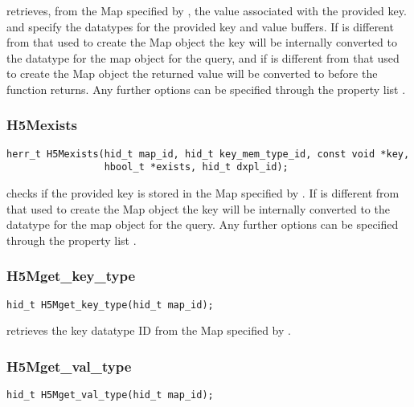 \documentclass[../design_doc.tex]{subfiles}
\begin{document}
 retrieves, from the Map specified by , the value associated with the provided key.  and  specify the datatypes for the provided key and value buffers. If  is different from that used to create the Map object the key will be internally converted to the datatype for the map object for the query, and if  is different from that used to create the Map object the returned value will be converted to  before the function returns. Any further options can be specified through the property list .

\subsubsection{H5Mexists}

\begin{verbatim}
herr_t H5Mexists(hid_t map_id, hid_t key_mem_type_id, const void *key,
                 hbool_t *exists, hid_t dxpl_id);
\end{verbatim}

 checks if the provided key is stored in the Map specified by . If  is different from that used to create the Map object the key will be internally converted to the datatype for the map object for the query. Any further options can be specified through the property list .

\subsubsection{H5Mget\_key\_type}

\begin{verbatim}
hid_t H5Mget_key_type(hid_t map_id);
\end{verbatim}

 retrieves the key datatype ID from the Map specified by .

\subsubsection{H5Mget\_val\_type}

\begin{verbatim}
hid_t H5Mget_val_type(hid_t map_id);
\end{verbatim}
\end{document}
